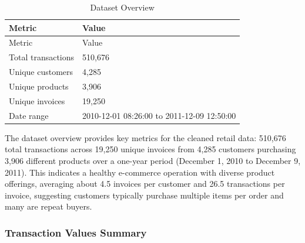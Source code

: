\documentclass[
]{article}
\newenvironment{Shaded}{\begin{snugshade}}{\end{snugshade}}
\newcommand{\AttributeTok}[1]{\textcolor[rgb]{0.13,0.29,0.53}{#1}}
\newcommand{\CommentTok}[1]{\textcolor[rgb]{0.56,0.35,0.01}{\textit{#1}}}
\newcommand{\ConstantTok}[1]{\textcolor[rgb]{0.56,0.35,0.01}{#1}}
\newcommand{\DecValTok}[1]{\textcolor[rgb]{0.00,0.00,0.81}{#1}}
\newcommand{\FunctionTok}[1]{\textcolor[rgb]{0.13,0.29,0.53}{\textbf{#1}}}
\newcommand{\NormalTok}[1]{#1}
\newcommand{\OtherTok}[1]{\textcolor[rgb]{0.56,0.35,0.01}{#1}}
\newcommand{\SpecialCharTok}[1]{\textcolor[rgb]{0.81,0.36,0.00}{\textbf{#1}}}
\newcommand{\StringTok}[1]{\textcolor[rgb]{0.31,0.60,0.02}{#1}}
\begin{document}
\begin{longtable}[]{@{}ll@{}}
\caption{Dataset Overview}\tabularnewline
\toprule\noalign{}
Metric & Value \\
\midrule\noalign{}
\endfirsthead
\toprule\noalign{}
Metric & Value \\
\midrule\noalign{}
\endhead
\bottomrule\noalign{}
\endlastfoot
Total transactions & 510,676 \\
Unique customers & 4,285 \\
Unique products & 3,906 \\
Unique invoices & 19,250 \\
Date range & 2010-12-01 08:26:00 to 2011-12-09 12:50:00 \\
\end{longtable}

The dataset overview provides key metrics for the cleaned retail data:
510,676 total transactions across 19,250 unique invoices from 4,285
customers purchasing 3,906 different products over a one-year period
(December 1, 2010 to December 9, 2011). This indicates a healthy
e-commerce operation with diverse product offerings, averaging about 4.5
invoices per customer and 26.5 transactions per invoice, suggesting
customers typically purchase multiple items per order and many are
repeat buyers.\newpage

\subsubsection{Transaction Values
Summary}\label{transaction-values-summary}

\begin{Shaded}
\end{Shaded}
\end{document}
